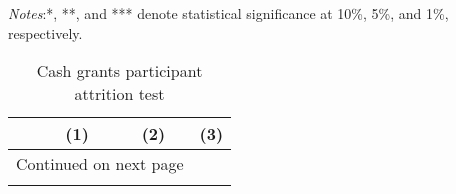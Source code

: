 \documentclass[10pt,a4paper]{article}
\begin{document}
\begin{center}
	{\tiny \tabcolsep=1pt  %
		\begin{ThreePartTable}
			\begin{TableNotes}[flushleft]
				\tiny
				\item \textit{Notes}:*, **, and *** denote statistical significance at 10\%, 5\%, and 1\%, respectively.
			\end{TableNotes}
			\begin{longtable}{l*{3}{c}}
				\caption{Cash grants participant attrition test}\label{tab:attrition_cash}					\\
				\toprule
				\hline 
				&\multicolumn{1}{p{2cm}}{\centering(1)}
				&\multicolumn{1}{p{2cm}}{\centering (2)}
				&\multicolumn{1}{p{2cm}}{\centering (3)} \\
				\hline 
				\endfirsthead
				\hline
				\endhead
				\hline
				\multicolumn{3}{r}{{Continued on next page}} \\
				\endfoot
				
				\bottomrule
				\insertTableNotes
				\endlastfoot
				
			\end{longtable}
		\end{ThreePartTable}
	}
\end{center}
\end{document}
